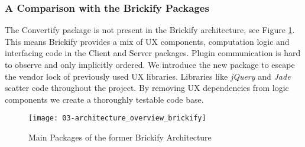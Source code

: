 \documentclass[../ClassicThesis.tex]{subfiles}
\begin{document}


\subsubsection{A Comparison with the Brickify Packages}

The Convertify package is not present in the Brickify architecture, see Figure
\ref{fig:architecture_overview_brickify}. This means Brickify provides a mix of
UX components, computation logic and interfacing code in the Client and Server
packages. Plugin communication is hard to observe and only implicitly ordered.
We introduce the new package to escape the vendor lock of previously used UX libraries. Libraries like 
\emph{jQuery} and \emph{Jade}  scatter code throughout the
project. By removing UX dependencies from logic components we create a
thoroughly testable code base.

\begin{figure}
  \texttt{[image: 03-architecture\_overview\_brickify]}
  \caption{Main Packages of the former Brickify Architecture}
  \label{fig:architecture_overview_brickify}
\end{figure}
\end{document}

